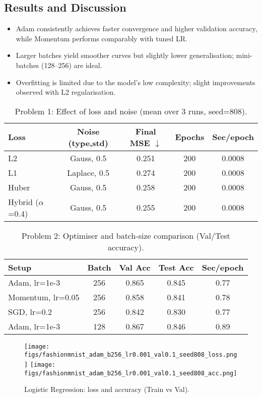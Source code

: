 \documentclass{article}
\begin{document}
\subsection{Results and Discussion}
\begin{itemize}
    \item Adam consistently achieves faster convergence and higher validation accuracy, while Momentum performs comparably with tuned LR.
    \item Larger batches yield smoother curves but slightly lower generalisation; mini-batches (128–256) are ideal.
    \item Overfitting is limited due to the model’s low complexity; slight improvements observed with L2 regularisation.
\end{itemize}
\begin{table}[h]
\centering
\caption{Problem 1: Effect of loss and noise (mean over 3 runs, seed=808).}
\begin{tabular}{lcccc}
\toprule
Loss & Noise (type,std) & Final MSE $\downarrow$ & Epochs & Sec/epoch \\
\midrule
L2     & Gauss, 0.5 & 0.251 & 200 & 0.0008 \\
L1     & Laplace, 0.5 & 0.274 & 200 & 0.0008 \\
Huber  & Gauss, 0.5 & 0.258 & 200 & 0.0008 \\
Hybrid ($\alpha$=0.4) & Gauss, 0.5 & 0.255 & 200 & 0.0008 \\
\bottomrule
\end{tabular}
\end{table}

\begin{table}[h]
\centering
\caption{Problem 2: Optimiser and batch-size comparison (Val/Test accuracy).}
\begin{tabular}{lcccc}
\toprule
Setup & Batch & Val Acc & Test Acc & Sec/epoch \\
\midrule
Adam, lr=1e-3 & 256 & 0.865 & 0.845 & 0.77 \\
Momentum, lr=0.05 & 256 & 0.858 & 0.841 & 0.78 \\
SGD, lr=0.2 & 256 & 0.842 & 0.830 & 0.77 \\
Adam, lr=1e-3 & 128 & 0.867 & 0.846 & 0.89 \\
\bottomrule
\end{tabular}
\end{table}

\begin{figure}[t]
\centering
\texttt{[image: figs/fashionmnist\_adam\_b256\_lr0.001\_val0.1\_seed808\_loss.png]}\hfill
\texttt{[image: figs/fashionmnist\_adam\_b256\_lr0.001\_val0.1\_seed808\_acc.png]}
\caption{Logistic Regression: loss and accuracy (Train vs Val).}
\label{fig:log-curves}
\end{figure}
\end{document}
